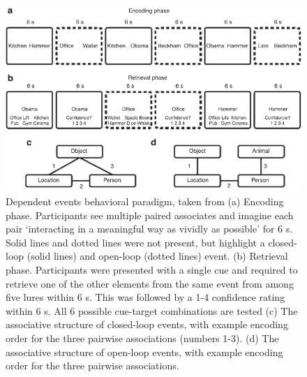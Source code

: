 \documentclass[11pt, titlepage, twoside]{article}
\begin{document}
\begin{figure}
    \begin{center}
	\includegraphics[width=.9\textwidth]{figs/deev.pdf}
    \end{center}
      \caption[Dependent Events Paradigm]{
       Dependent events behavioral paradigm, taken from \textcite{HornerBisbyBushEtAl15} (a) Encoding phase. Participants see multiple paired associates and imagine each pair `interacting in a meaningful way as vividly as possible' for 6 s. Solid lines and dotted lines were not present, but highlight a closed-loop (solid lines) and open-loop (dotted lines) event. (b) Retrieval phase.  Participants were presented with a single cue and required to retrieve one of the other elements from the same event from among five lures within 6 s. This was followed by a 1-4 confidence rating within 6 s.  All 6 possible cue-target combinations are tested (c) The associative structure of closed-loop events, with example encoding order for the three pairwise associations (numbers 1-3). (d) The associative structure of open-loop events, with example encoding order for the three pairwise associations.
	}
     \label{fig:deev}
\end{figure}
\end{document}
